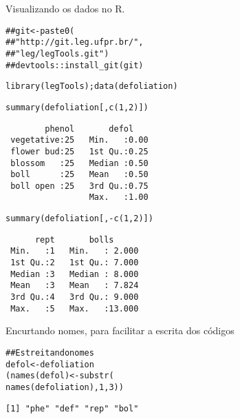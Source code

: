 \documentclass[nohyper, justified, svgnames]{tufte-handout}\usepackage[]{graphicx}\usepackage[]{color}
\makeatletter
\newcommand{\hlnum}[1]{\textcolor[rgb]{0,1,1}{#1}}%
\newcommand{\hlcom}[1]{\textcolor[rgb]{0.314,0.439,0.502}{#1}}%
\newcommand{\hlopt}[1]{\textcolor[rgb]{0.878,0.933,0.878}{#1}}%
\newcommand{\hlstd}[1]{\textcolor[rgb]{0.878,0.933,0.878}{#1}}%
\newcommand{\hlkwb}[1]{\textcolor[rgb]{0.678,0.847,0.902}{#1}}%
\newcommand{\hlkwd}[1]{\textcolor[rgb]{1,0.6,0.6}{#1}}%
\newenvironment{kframe}{%
 \def\at@end@of@kframe{}%
 \ifinner\ifhmode%
  \def\at@end@of@kframe{\end{minipage}}%
  \begin{minipage}{\columnwidth}%
 \fi\fi%
 \def\FrameCommand##1{\hskip\@totalleftmargin \hskip-\fboxsep
 \colorbox{shadecolor}{##1}\hskip-\fboxsep
     \hskip-\linewidth \hskip-\@totalleftmargin \hskip\columnwidth}%
 \MakeFramed {\advance\hsize-\width
   \@totalleftmargin\z@ \linewidth\hsize
   \@setminipage}}%
 {\par\unskip\endMakeFramed%
 \at@end@of@kframe}
\newenvironment{knitrout}{}{} %
\makeatother
\begin{document}
\begin{margintable}
Visualizando os dados no R.
\begin{knitrout}\scriptsize
{}\color{fgcolor}\begin{kframe}
\begin{alltt}
\hlcom{## git <- paste0(}
\hlcom{##     "http://git.leg.ufpr.br/",}
\hlcom{##     "leg/legTools.git")}
\hlcom{## devtools::install_git(git)}

\hlkwd{library}\hlstd{(legTools);} \hlkwd{data}\hlstd{(defoliation)}

\hlkwd{summary}\hlstd{(defoliation[,} \hlkwd{c}\hlstd{(}\hlnum{1}\hlstd{,} \hlnum{2}\hlstd{)])}
\end{alltt}
\begin{verbatim}
        phenol       defol     
 vegetative:25   Min.   :0.00  
 flower bud:25   1st Qu.:0.25  
 blossom   :25   Median :0.50  
 boll      :25   Mean   :0.50  
 boll open :25   3rd Qu.:0.75  
                 Max.   :1.00  
\end{verbatim}
\begin{alltt}
\hlkwd{summary}\hlstd{(defoliation[,} \hlopt{-}\hlkwd{c}\hlstd{(}\hlnum{1}\hlstd{,} \hlnum{2}\hlstd{)])}
\end{alltt}
\begin{verbatim}
      rept       bolls       
 Min.   :1   Min.   : 2.000  
 1st Qu.:2   1st Qu.: 7.000  
 Median :3   Median : 8.000  
 Mean   :3   Mean   : 7.824  
 3rd Qu.:4   3rd Qu.: 9.000  
 Max.   :5   Max.   :13.000  
\end{verbatim}
\end{kframe}
\end{knitrout}

Encurtando nomes, para facilitar a escrita dos códigos
\begin{knitrout}\scriptsize
{}\color{fgcolor}\begin{kframe}
\begin{alltt}
\hlcom{## Estreitando nomes}
\hlstd{defol} \hlkwb{<-} \hlstd{defoliation}
\hlstd{(}\hlkwd{names}\hlstd{(defol)} \hlkwb{<-} \hlkwd{substr}\hlstd{(}
    \hlkwd{names}\hlstd{(defoliation),} \hlnum{1}\hlstd{,} \hlnum{3}\hlstd{))}
\end{alltt}
\begin{verbatim}
[1] "phe" "def" "rep" "bol"
\end{verbatim}
\end{kframe}
\end{knitrout}

\end{margintable}
\end{document}
